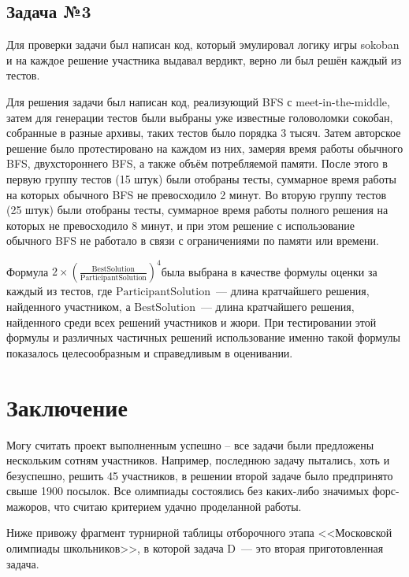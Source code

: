 \documentclass[a4paper]{article}
\begin{document}
\newpage

\subsection{Задача №3}

Для проверки задачи был написан код, который эмулировал логику игры sokoban и на каждое решение участника выдавал вердикт, верно ли был решён каждый из тестов.


Для решения задачи был написан код, реализующий BFS с meet-in-the-middle, затем для генерации тестов были выбраны уже известные головоломки сокобан, собранные в разные архивы, таких тестов было порядка 3 тысяч. Затем авторское решение было протестировано на каждом из них, замеряя время работы обычного BFS, двухстороннего BFS, а также объём потребляемой памяти. После этого в первую группу тестов (15 штук) были отобраны тесты, суммарное время работы на которых обычного BFS не превосходило 2 минут. Во вторую группу тестов (25 штук) были отобраны тесты, суммарное время работы полного решения  на которых не превосходило 8 минут, и при этом решение с использование обычного BFS не работало в связи с ограничениями по памяти или времени.


Формула  $2 \times\left(\frac{\text {BestSolution}}{\text {ParticipantSolution}}\right)^{4}$была выбрана в качестве формулы оценки за каждый из тестов, где $\text{ParticipantSolution}$~--- длина кратчайшего решения, найденного участником, а $\text{BestSolution}$~--- длина кратчайшего решения, найденного  среди всех решений  участников и жюри. При тестировании этой формулы и различных частичных решений использование именно такой формулы показалось целесообразным и справедливым в оценивании.


\newpage
\section{Заключение}

Могу считать проект выполненным успешно -- все задачи были предложены нескольким сотням участников. Например, последнюю задачу пытались, хоть и безуспешно, решить 45 участников, в решении второй задаче было предпринято свыше 1900 посылок. Все олимпиады состоялись без каких-либо значимых форс-мажоров, что считаю критерием удачно проделанной работы.

Ниже привожу фрагмент турнирной таблицы отборочного этапа <<Московской олимпиады школьников>>, в которой задача D~--- это вторая приготовленная задача.
\end{document}
